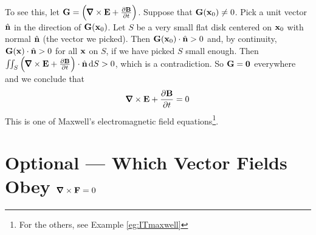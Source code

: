 To see this, let 
$\vG=\Big(\vnabla\times\vE+\frac{\partial\vB}{\partial t}\Big)$.
Suppose that $\mathbf{G}(\mathbf{x}_0)\ne 0$. Pick a unit vector $\hat{\mathbf{n}}$ in the direction
of $\mathbf{G}(\mathbf{x}_0)$. Let $S$ be a very small flat disk centered on $\mathbf{x}_0$
with normal $\hat{\mathbf{n}}$ (the vector we picked). Then $\mathbf{G}(\mathbf{x}_0)\cdot\hat{\mathbf{n}}>0$
and, by continuity, $\mathbf{G}(\mathbf{x})\cdot\hat{\mathbf{n}}>0$ for all $\mathbf{x}$ on $S$, if we have
picked $S$ small enough.
 Then $\dblInt_S\Big(\vnabla\times\vE+\frac{\partial\vB}{\partial t}\Big)\cdot \hn\,\dee{S}>0$, which is a contradiction.
So $\mathbf{G}=\mathbf{0}$ everywhere and we conclude that
\begin{equation*}
\vnabla\times\vE+\frac{\partial\vB}{\partial t}=0
\end{equation*}
This is one of Maxwell's electromagnetic field equations\footnote{For the others, see Example \ref{eg:ITmaxwell}}.



\section{Optional --- Which Vector Fields Obey 
                           $\vnabla\times\vF=0$}
\label{sec:cohomology}


